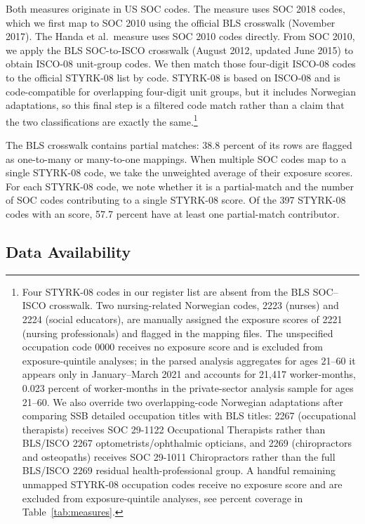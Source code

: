 \documentclass[12pt]{article}
\begin{document}
Both measures originate in US SOC codes. The \citet{eloundou2024} measure uses SOC 2018 codes, which we first map to SOC 2010 using the official BLS crosswalk (November 2017). The Handa et al.\ measure uses SOC 2010 codes directly. From SOC 2010, we apply the BLS SOC-to-ISCO crosswalk (August 2012, updated June 2015) to obtain ISCO-08 unit-group codes. We then match those four-digit ISCO-08 codes to the official STYRK-08 list by code. STYRK-08 is based on ISCO-08 and is code-compatible for overlapping four-digit unit groups, but it includes Norwegian adaptations, so this final step is a filtered code match rather than a claim that the two classifications are exactly the same.\footnote{Four STYRK-08 codes in our register list are absent from the BLS SOC--ISCO crosswalk. Two nursing-related Norwegian codes, 2223 (nurses) and 2224 (social educators), are manually assigned the exposure scores of 2221 (nursing professionals) and flagged in the mapping files. The unspecified occupation code 0000 receives no exposure score and is excluded from exposure-quintile analyses; in the parsed analysis aggregates for ages 21--60 it appears only in January--March 2021 and accounts for 21,417 worker-months, 0.023 percent of worker-months in the private-sector analysis sample for ages 21--60. We also override two overlapping-code Norwegian adaptations after comparing SSB detailed occupation titles with BLS titles: 2267 (occupational therapists) receives SOC 29-1122 Occupational Therapists rather than BLS/ISCO 2267 optometrists/ophthalmic opticians, and 2269 (chiropractors and osteopaths) receives SOC 29-1011 Chiropractors rather than the full BLS/ISCO 2269 residual health-professional group. A handful remaining unmapped STYRK-08 occupation codes receive no exposure score and are excluded from exposure-quintile analyses, see percent coverage in Table~\ref{tab:measures}.}

The BLS crosswalk contains partial matches: 38.8 percent of its rows are flagged as one-to-many or many-to-one mappings. When multiple SOC codes map to a single STYRK-08 code, we take the unweighted average of their exposure scores. For each STYRK-08 code, we note whether it is a partial-match and the number of SOC codes contributing to a single STYRK-08 score. Of the 397 STYRK-08 codes with an \citet{eloundou2024} score, 57.7 percent have at least one partial-match contributor.


\subsection*{Data Availability}
\end{document}
